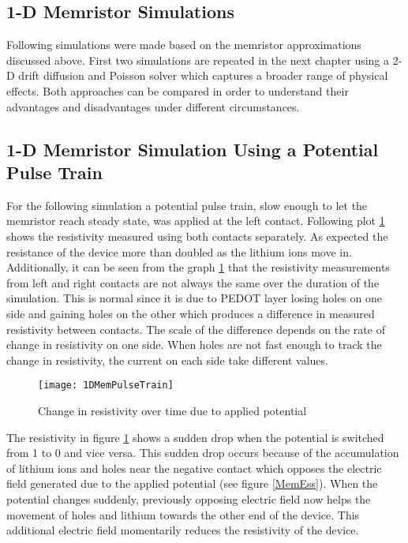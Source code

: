\begin{doublespace}
\clearpage
\section{1-D Memristor Simulations}

Following simulations were made based on the memristor approximations discussed above. First two simulations are repeated in the next chapter using a 2-D drift diffusion and Poisson solver which captures a broader range of physical effects. Both approaches can be compared in order to understand their advantages and disadvantages under different circumstances.

\subsection{1-D Memristor Simulation Using a Potential Pulse Train}
  
For the following simulation a potential pulse train, slow enough to let the memristor reach steady state, was applied at the left contact. Following plot \ref{MemResTrain} shows the resistivity measured using both contacts separately. As expected the resistance of the device more than doubled as the lithium ions move in. Additionally, it can be seen from the graph \ref{MemResTrain} that the resistivity measurements from left and right contacts are not always the same over the duration of the simulation. This is normal since it is due to PEDOT layer losing holes on one side and gaining holes on the other which produces a difference in measured resistivity between contacts. The scale of the difference depends on the rate of change in resistivity on one side. When holes are not fast enough to track the change in resistivity, the current on each side take different values.  

\begin{figure}[!htp]
\centering
\texttt{[image: 1DMemPulseTrain]}
\caption{Change in resistivity over time due to applied potential} 
\label{MemResTrain}
\end{figure}

The resistivity in figure \ref{MemResTrain} shows a sudden drop when the potential is switched from 1 to 0 and vice versa. This sudden drop occurs because of the accumulation of lithium ions and holes near the negative contact which opposes the electric field generated due to the applied potential (see figure \ref{MemEss}). When the potential changes suddenly, previously opposing electric field now helps the movement of holes and lithium towards the other end of the device. This additional electric field momentarily reduces the resistivity of the device.


\end{doublespace}

